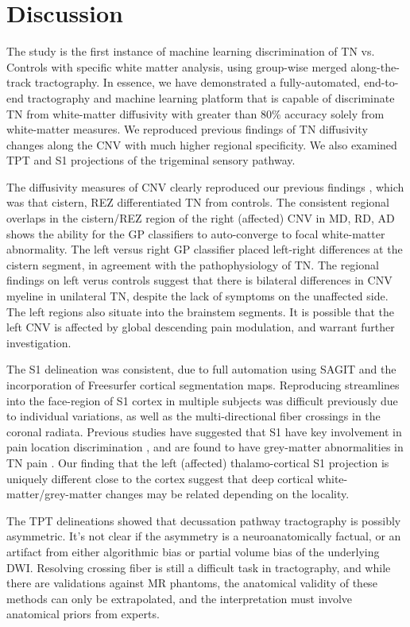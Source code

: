 \section{Discussion}
The study is the first instance of machine learning discrimination of TN vs. Controls with specific white matter analysis, using group-wise merged along-the-track tractography. In essence, we have demonstrated a fully-automated, end-to-end tractography and machine learning platform that is capable of discriminate TN from white-matter diffusivity with greater than 80\% accuracy solely from white-matter measures. We reproduced previous findings of TN diffusivity changes along the CNV with much higher regional specificity. We also examined TPT and S1 projections of the trigeminal sensory pathway.

The diffusivity measures of CNV clearly reproduced our previous findings \cite{Chen2016a}, which was that cistern, REZ differentiated TN from controls. The consistent regional overlaps in the cistern/REZ region of the right (affected) CNV in MD, RD, AD shows the ability for the GP classifiers to auto-converge to focal white-matter abnormality. The left versus right GP classifier placed left-right differences at the cistern segment, in agreement with the pathophysiology of TN. The regional findings on left verus controls suggest that there is bilateral differences in CNV myeline in unilateral TN, despite the lack of symptoms on the unaffected side. The left regions also situate into the brainstem segments. It is possible that the left CNV is affected by global descending pain modulation, and warrant further investigation. 

The S1 delineation was consistent, due to full automation using SAGIT and the incorporation of Freesurfer cortical segmentation maps. Reproducing streamlines into the face-region of S1 cortex in multiple subjects was difficult previously due to individual variations, as well as the multi-directional fiber crossings in the coronal radiata. Previous studies have suggested that S1 have key involvement in pain location discrimination \cite{bushnell1999pain}, and are found to have grey-matter abnormalities in TN pain \cite{Desouza2013c}. Our finding that the left (affected) thalamo-cortical S1 projection is uniquely different close to the cortex suggest that deep cortical white-matter/grey-matter changes may be related depending on the locality. 

The TPT delineations showed that decussation pathway tractography is possibly asymmetric. It’s not clear if the asymmetry is a neuroanatomically factual, or an artifact from either algorithmic bias or partial volume bias of the underlying DWI. Resolving crossing fiber is still a difficult task in tractography, and while there are validations against MR phantoms, the anatomical validity of these methods can only be extrapolated, and the interpretation must involve anatomical priors from experts.  

